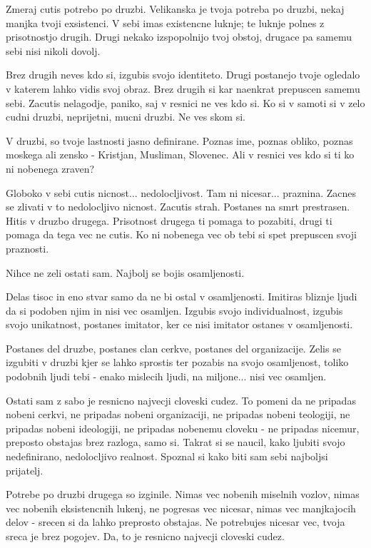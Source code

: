         

   Zmeraj cutis potrebo po druzbi. Velikanska je tvoja potreba po druzbi, nekaj manjka tvoji exsistenci. V sebi imas existencne luknje; te luknje polnes z prisotnostjo drugih. Drugi nekako izspopolnijo tvoj obstoj, drugace pa samemu sebi nisi nikoli dovolj. 

Brez drugih neves kdo si, izgubis svojo identiteto. Drugi postanejo tvoje ogledalo v katerem lahko vidis svoj obraz. Brez drugih si kar naenkrat prepuscen samemu sebi. Zacutis nelagodje, paniko, saj v resnici ne ves kdo si. Ko si v samoti si v zelo cudni druzbi, neprijetni, mucni druzbi. Ne ves skom si. 

V druzbi, so tvoje lastnosti jasno definirane. Poznas ime, poznas obliko, poznas moskega ali zensko - Kristjan, Musliman, Slovenec. Ali v resnici ves kdo si ti ko ni nobenega zraven? 

Globoko v sebi cutis nicnost... nedolocljivost. Tam ni nicesar... praznina. Zacnes se zlivati v to nedolocljivo nicnost. Zacutis strah. Postanes na smrt prestrasen. Hitis v druzbo drugega. Prisotnost drugega ti pomaga to pozabiti, drugi ti pomaga da tega vec ne cutis. Ko ni nobenega vec ob tebi si spet prepuscen svoji praznosti. 

Nihce ne zeli ostati sam. Najbolj se bojis osamljenosti. 

Delas tisoc in eno stvar samo da ne bi ostal v osamljenosti. Imitiras bliznje ljudi da si podoben njim in nisi vec osamljen. Izgubis svojo individualnost, izgubis svojo unikatnost, postanes imitator, ker ce nisi imitator ostanes v osamljenosti. 

Postanes del druzbe, postanes clan cerkve, postanes del organizacije. Zelis se izgubiti v druzbi kjer se lahko sprostis ter pozabis na svojo osamljenost, toliko podobnih ljudi tebi - enako mislecih ljudi, na miljone... nisi vec osamljen. 

Ostati sam z sabo je resnicno najvecji cloveski cudez. To pomeni da ne pripadas nobeni cerkvi, ne pripadas nobeni organizaciji, ne pripadas nobeni teologiji, ne pripadas nobeni ideologiji, ne pripadas nobenemu cloveku - ne pripadas nicemur, preposto obstajas brez razloga, samo si. Takrat si se naucil, kako ljubiti svojo nedefinirano, nedolocljivo realnost. Spoznal si kako biti sam sebi najboljsi prijatelj. 

Potrebe po druzbi drugega so izginile. Nimas vec nobenih miselnih vozlov, nimas vec nobenih eksistencnih lukenj, ne pogresas vec nicesar, nimas vec manjkajocih delov - srecen si da lahko preprosto obstajas. Ne potrebujes nicesar vec, tvoja sreca je brez pogojev. Da, to je resnicno najvecji cloveski cudez. 


